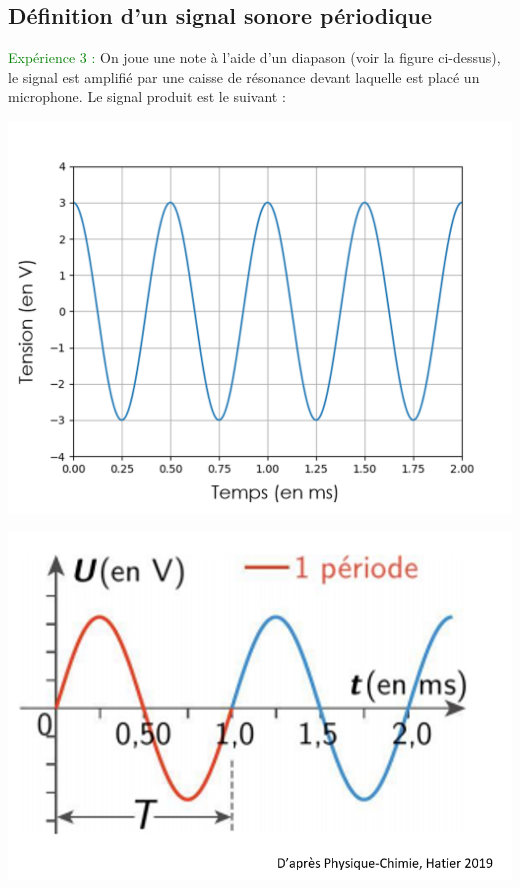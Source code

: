 \subsection{Définition d'un signal sonore périodique}
\textcolor{green}{Expérience 3 :} On joue une note à l'aide d'un diapason (voir la figure ci-dessus), le signal est amplifié par une caisse de résonance devant laquelle est placé un microphone. Le signal produit est le suivant :
\begin{multicols}{2}
\begin{center}
    \includegraphics[scale=0.5]{Images/Signal_diapason.PNG}
\end{center}
\begin{tcolorbox}
[colback=green!5!white,colframe=green!75!black,title=\textbf{Signal périodique :}]
\vspace{3cm}
\begin{center}
    \includegraphics[scale=0.5]{Images/Periode.PNG}
\end{center}
\end{tcolorbox}
\end{multicols}

